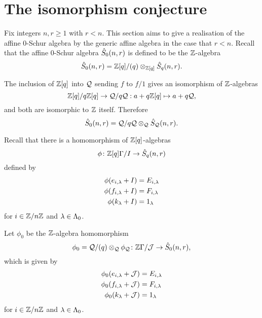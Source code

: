 \documentclass[a4paper, 11pt, twoside]{report}
\begin{document}
\section{The isomorphism conjecture}

Fix integers $n,r\geq 1$ with $r<n$. This section aims to give a realisation of the affine $0$-Schur algebra by the generic affine algebra in the case that $r<n$. Recall that the affine $0$-Schur algebra $\hat{S}_0(n,r)$ is defined to be the $\mathbb{Z}$-algebra
\begin{equation*}
\hat{S}_0(n,r) = \mathbb{Z}[q]/{(q)}\otimes_{\mathbb{Z}[q]}\hat{S}_q(n,r).
\end{equation*}

The inclusion of $\mathbb{Z}[q]$ into $\mathcal{Q}$ sending $f$ to $f/1$ gives an isomorphism of $\mathbb{Z}$-algebras
\begin{equation*}
\mathbb{Z}[q]/{q\mathbb{Z}[q]}\to\mathcal{Q}/{q\mathcal{Q}}: a + q\mathbb{Z}[q] \mapsto a + q\mathcal{Q},
\end{equation*}
and both are isomorphic to $\mathbb{Z}$ itself. Therefore
\begin{equation*}
\hat{S}_0(n,r) = \mathcal{Q}/{q\mathcal{Q}}\otimes_{\mathcal{Q}} \hat{S}_{\mathcal{Q}}(n,r).
\end{equation*}

Recall that there is a homomorphism of $\mathbb{Z}[q]$-algebras
\begin{equation*}
\phi\colon\mathbb{Z}[q]\Gamma/I \to\hat{S}_q(n,r)
\end{equation*}
defined by
\begin{align*}
\phi(e_{i,\lambda} +I)&= E_{i,\lambda}\\
\phi(f_{i,\lambda} +I)&= F_{i,\lambda}\\
\phi(k_\lambda +I)&= 1_\lambda
\end{align*}
for $i\in\mathbb{Z}/{n \mathbb{Z}}$ and $\lambda\in\Lambda_0{}$.

Let $\phi_0$ be the $\mathbb{Z}$-algebra homomorphism
\begin{equation*}
\phi_0 = \mathcal{Q}/{(q)}\otimes_{\mathcal{Q}} \phi_{\mathcal{Q}} \colon \mathbb{Z}\Gamma/{\mathcal{J}}\to\hat{S}_0(n,r),
\end{equation*}
which is given by
\begin{align*}
\phi_0(e_{i,\lambda} +\mathcal{J}) &= E_{i,\lambda}\\
\phi_0(f_{i,\lambda} +\mathcal{J}) &= F_{i,\lambda}\\
\phi_0(k_\lambda +\mathcal{J}) &= 1_\lambda
\end{align*}
for $i\in\mathbb{Z}/{n \mathbb{Z}}$ and $\lambda\in\Lambda_0{}$.
\end{document}

